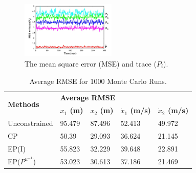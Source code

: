 \documentclass{ieeeaccess}
\begin{document}
\begin{figure}[t!]
\centering
\caption{The mean square error (MSE) and trace ($P_i$).}
\label{cpf_result_image}
\includegraphics[width=0.4\textwidth]{cpf_result_image.png}
\end{figure}

\begin{table}
\centering
\begin{tabular}{lllll}
\hline
\multirow{2}{*}{\textbf{Methods}} & \multicolumn{4}{l}{\textbf{Average RMSE}} \\ \cline{2-5} 
                  &     \textbf{$x_1$ (m)} & \textbf{$x_2$ (m)}     &  \textbf{$\dot{x}_1$ (m/s)}   &  \textbf{$\dot{x}_2$ (m/s)}  \\ \hline
             Unconstrained     &   95.479  &   87.496  &   52.413  &  49.972  \\
               CP   &  50.39   &   29.093  &  36.624   &  21.145  \\
               EP(I)   &   55.823  &  32.229   &  39.648   &  22.891  \\
               EP(${P^{u^{-1}}}$)   &  53.023   &   30.613  &   37.186  &  21.469  \\ \hline
\end{tabular}
\label{cpf_result_table}
\caption{Average RMSE for 1000 Monte Carlo Runs.}
\end{table}
\end{document}

